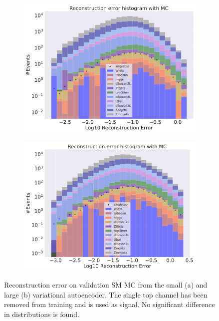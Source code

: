 \begin{figure}[H]
    \centering
    \begin{subfigure}{.45\textwidth}
        \includegraphics[width=\textwidth]{Figures/VAE_testing/small/b_data_recon_big_rm3_feats_sig_singletop.pdf}
        \caption{ }
        \label{fig:vae_small_singletop}
    \end{subfigure}
    \hfill
    \begin{subfigure}{.45\textwidth}
        \includegraphics[width=\textwidth]{Figures/VAE_testing/big/b_data_recon_big_rm3_feats_sig_singletop.pdf}
        \caption{ }
        \label{fig:vae_big_singletop}
    \end{subfigure}
    \hfill 
    \caption[VAE | Reconstruction error using Singletop channel as signal]{Reconstruction error on validation SM MC from the small (a) and large (b) variational autoencoder. The single top channel has been removed from training and 
    is used as signal. No significant difference in distributions is found. }
    \label{fig:vae_big_channel_2}
\end{figure}

